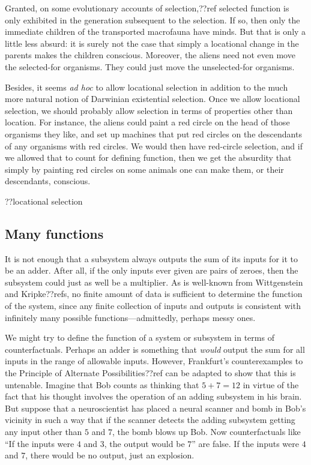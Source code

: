 Granted, on some evolutionary accounts of selection,??ref selected function is only exhibited in the generation
subsequent to the selection. If so, then only the immediate children of the transported macrofauna have minds.
But that is only a little less absurd: it is surely not the case that simply a locational change in the parents
makes the children conscious. Moreover, the aliens need not even move the selected-for organisms. They could just
move the unselected-for organisms.

Besides, it seems \textit{ad hoc} to allow locational selection in addition to the much more natural notion of 
Darwinian existential selection. Once we allow locational selection, we should probably allow selection in terms 
of properties other than location. For instance, the aliens could paint a red circle on the head of those organisms
they like, and set up machines that put red circles on the descendants of any organisms with red circles. We would
then have red-circle selection, and if we allowed that to count for defining function, then we get the absurdity
that simply by painting red circles on some animals one can make them, or their descendants, conscious. 

??locational selection

\subsection{Many functions}
It is not enough that a subsystem always outputs the sum of its inputs for it to be an adder. After all, if the only inputs ever
given are pairs of zeroes, then the subsystem could just as well be a multiplier. As is well-known from Wittgenstein and Kripke??refs,
no finite amount of data is sufficient to determine the function of the system, since any finite collection of inputs and outputs is
consistent with infinitely many possible functions---admittedly, perhaps messy ones.

We might try to define the function of a system or subsystem in terms of counterfactuals. Perhaps an adder is something that \textit{would}
output the sum for all inputs in the range of allowable inputs. However, Frankfurt's counterexamples to the Principle of Alternate
Possibilities??ref can be adapted to show that this is untenable. Imagine that Bob counts as thinking that $5+7=12$ in virtue of the 
fact that his thought involves the operation of an adding subsystem in his brain. But suppose that a neuroscientist has placed a neural
scanner and bomb in Bob's vicinity in such a way that if the scanner detects the adding subsystem getting any input other than 
$5$ and $7$, the bomb blows up Bob. Now counterfactuals like ``If the inputs were $4$ and $3$, the output would be $7$'' are false.
If the inputs were $4$ and $7$, there would be no output, just an explosion.


